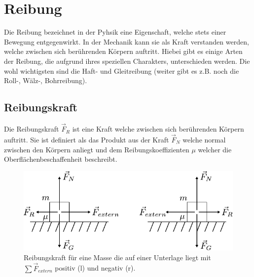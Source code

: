 



\chapter{Reibung}

Die Reibung bezeichnet in der Pyhsik eine Eigenschaft, welche stets einer
Bewegung entgegenwirkt. In der Mechanik kann sie als Kraft verstanden
werden, welche zwischen sich berührenden Körpern auftritt. Hiebei gibt es
einige Arten der Reibung, die aufgrund ihres speziellen Charakters, 
unterschieden werden. Die wohl wichtigsten sind die Haft- und 
Gleitreibung (weiter gibt es z.B. noch die Roll-, Wälz-, Bohrreibung).

\newpage
\section{Reibungskraft}
Die Reibungskraft $\vec{F}_R$ ist eine Kraft welche zwischen sich
berührenden Körpern auftritt. Sie ist definiert als das Produkt aus
der Kraft $\vec{F}_N$ welche normal zwischen den Körpern anliegt
und dem Reibungskoeffizienten $\mu$ welcher die 
Oberflächenbeschaffenheit beschreibt. 

\begin{figure}[h!]
	\centering
	\includegraphics[scale=0.8]{../fig/reibung.pdf}
	\caption{Reibungskraft für eine Masse die auf einer Unterlage 
		liegt mit $\sum \vec{F}_{extern}$ positiv (l)
		und negativ (r).}
\end{figure}

